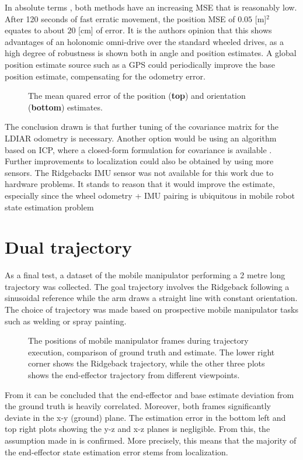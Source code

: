 \documentclass[times, utf8, diplomski, english]{fer}
\begin{document}
In absolute terms , both methods have an increasing MSE that is reasonably low. 
After 120 seconds of fast erratic movement, the position MSE of $0.05$ [m]$^2$ equates to about $20$ [cm] of error.
It is the authors opinion that this shows advantages of an holonomic omni-drive over the standard wheeled drives, as a high degree of robustness is shown both in angle and position estimates.
A global position estimate source such as a GPS could periodically improve the base position estimate, compensating for the odometry error.
\begin{figure}[h]
\centering

\caption{The mean quared error of the position (\textbf{top}) and orientation (\textbf{bottom}) estimates. }
\label{fig:mse_localization}
\end{figure}

The conclusion drawn is that further tuning of the covariance matrix for the LDIAR odometry is necessary.
Another option would be using an algorithm based on ICP, where a closed-form formulation for covariance is available \citep{censi2007accurate}.
Further improvements to localization could also be obtained by using more sensors. 
The Ridgebacks IMU sensor was not available for this work due to hardware problems.
It stands to reason that it would improve the estimate, especially since the wheel odometry + IMU pairing is ubiquitous in mobile robot state estimation problem 

\section{Dual trajectory}
As a final test, a dataset of the mobile manipulator performing a 2 metre long trajectory was collected.
The goal trajectory involves the Ridgeback following a sinusoidal reference while the arm draws a straight line with constant orientation.
The choice of trajectory was made based on prospective mobile manipulator tasks such as welding or spray painting.
\begin{figure}[h]
\centering

\caption{The positions of mobile manipulator frames during trajectory execution, comparison of ground truth and estimate.
The lower right corner shows the Ridgeback trajectory, while the other three plots shows the end-effector trajectory from different viewpoints.}
\label{fig:dual_trajectory}
\end{figure}

From  it can be concluded that the end-effector and base estimate deviation from the ground truth is heavily correlated.
Moreover, both frames significantly deviate in the x-y (ground) plane.
The estimation error in the bottom left and top right plots showing the y-z and x-z planes is negligible.
From this, the assumption made in  is confirmed.
More precisely, this means that the majority of the end-effector state estimation error stems from localization.
\end{document}
